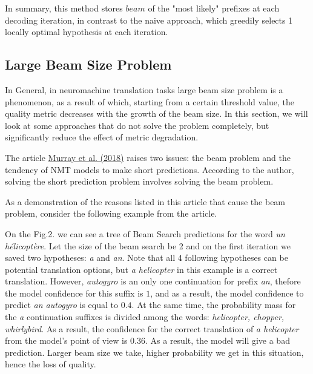 \documentclass[a4paper,14pt]{extarticle}
\newcommand{\bibref}[3]{\hyperlink{#1}{#2 (#3)}}
\begin{document}
	In summary, this method stores $beam$ of the "most likely" prefixes at each decoding iteration, in contrast to the naive approach, which greedily selects 1 locally optimal hypothesis at each iteration.
	
	\subsection{Large Beam Size Problem}
	In General, in neuromachine translation tasks large beam size problem is a phenomenon, as a result of which, starting from a certain threshold value, the quality metric decreases with the growth of the beam size. In this section, we will look at some approaches that do not solve the problem completely, but significantly reduce the effect of metric degradation.
	
	The article \bibref{corr_len_bias}{Murray et al.}{2018} raises two issues: the beam problem and the tendency of NMT models to make short predictions. According to the author, solving the short prediction problem involves solving the beam problem.
	
	As a demonstration of the reasons listed in this article that cause the beam problem, consider the following example from the article.
	
	On the Fig.2. we can see a tree of Beam Search predictions for the word \textit{un hélicoptère}. Let the size of the beam search be 2 and on the first iteration we saved two hypotheses: \textit{a} and \textit{an}. Note that all 4 following hypotheses can be potential translation options, but \textit{a helicopter} in this example is a correct translation. However, \textit{autogyro} is an only one continuation for prefix \textit{an}, thefore the model confidence for this suffix is $1$, and as a result, the model confidence to predict \textit{an autogyro} is equal to $0.4$. At the same time, the probability mass for the \textit{a} continuation suffixes is divided among the words: \textit{helicopter, chopper, whirlybird}. As a result, the confidence for the correct translation of \textit{a helicopter} from the model's point of view is $0.36$. As a result, the model will give a bad prediction. Larger beam size we take, higher probability we get in this situation, hence the loss of quality.
	
	\begin{figure}[t]
	\end{figure}
	
\end{document}
